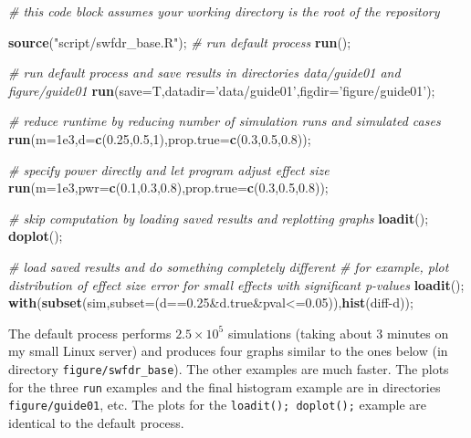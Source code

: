 \documentclass[]{article}
\newenvironment{Shaded}{\begin{snugshade}}{\end{snugshade}}
\newcommand{\KeywordTok}[1]{\textcolor[rgb]{0.13,0.29,0.53}{\textbf{{#1}}}}
\newcommand{\DataTypeTok}[1]{\textcolor[rgb]{0.13,0.29,0.53}{{#1}}}
\newcommand{\DecValTok}[1]{\textcolor[rgb]{0.00,0.00,0.81}{{#1}}}
\newcommand{\FloatTok}[1]{\textcolor[rgb]{0.00,0.00,0.81}{{#1}}}
\newcommand{\StringTok}[1]{\textcolor[rgb]{0.31,0.60,0.02}{{#1}}}
\newcommand{\CommentTok}[1]{\textcolor[rgb]{0.56,0.35,0.01}{\textit{{#1}}}}
\newcommand{\NormalTok}[1]{{#1}}
\begin{document}
\begin{Shaded}
\begin{Highlighting}[]
\CommentTok{# this code block assumes your working directory is the root of the repository}

\KeywordTok{source}\NormalTok{(}\StringTok{"script/swfdr_base.R"}\NormalTok{);}
\CommentTok{# run default process}
\KeywordTok{run}\NormalTok{();}

\CommentTok{# run default process and save results in directories data/guide01 and figure/guide01}
\KeywordTok{run}\NormalTok{(}\DataTypeTok{save=}\NormalTok{T,}\DataTypeTok{datadir=}\StringTok{'data/guide01'}\NormalTok{,}\DataTypeTok{figdir=}\StringTok{'figure/guide01'}\NormalTok{);}

\CommentTok{# reduce runtime by reducing number of simulation runs and simulated cases}
\KeywordTok{run}\NormalTok{(}\DataTypeTok{m=}\FloatTok{1e3}\NormalTok{,}\DataTypeTok{d=}\KeywordTok{c}\NormalTok{(}\FloatTok{0.25}\NormalTok{,}\FloatTok{0.5}\NormalTok{,}\DecValTok{1}\NormalTok{),}\DataTypeTok{prop.true=}\KeywordTok{c}\NormalTok{(}\FloatTok{0.3}\NormalTok{,}\FloatTok{0.5}\NormalTok{,}\FloatTok{0.8}\NormalTok{));}

\CommentTok{# specify power directly and let program adjust effect size}
\KeywordTok{run}\NormalTok{(}\DataTypeTok{m=}\FloatTok{1e3}\NormalTok{,}\DataTypeTok{pwr=}\KeywordTok{c}\NormalTok{(}\FloatTok{0.1}\NormalTok{,}\FloatTok{0.3}\NormalTok{,}\FloatTok{0.8}\NormalTok{),}\DataTypeTok{prop.true=}\KeywordTok{c}\NormalTok{(}\FloatTok{0.3}\NormalTok{,}\FloatTok{0.5}\NormalTok{,}\FloatTok{0.8}\NormalTok{));}

\CommentTok{# skip computation by loading saved results and replotting graphs}
\KeywordTok{loadit}\NormalTok{();}
\KeywordTok{doplot}\NormalTok{();}

\CommentTok{# load saved results and do something completely different}
\CommentTok{# for example, plot distribution of effect size error for small effects with significant p-values }
\KeywordTok{loadit}\NormalTok{();}
\KeywordTok{with}\NormalTok{(}\KeywordTok{subset}\NormalTok{(sim,}\DataTypeTok{subset=}\NormalTok{(d==}\FloatTok{0.25}\NormalTok{&d.true&pval<=}\FloatTok{0.05}\NormalTok{)),}\KeywordTok{hist}\NormalTok{(diff-d));}
\end{Highlighting}
\end{Shaded}

The default process performs \(2.5 \times 10^5\) simulations (taking
about 3 minutes on my small Linux server) and produces four graphs
similar to the ones below (in directory \texttt{figure/swfdr\_base}).
The other examples are much faster. The plots for the three \texttt{run}
examples and the final histogram example are in directories
\texttt{figure/guide01}, etc. The plots for the
\texttt{loadit();\ doplot();} example are identical to the default
process.
\end{document}
